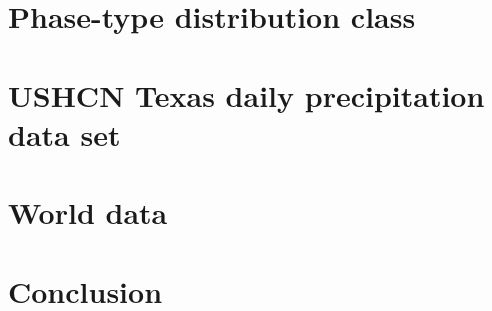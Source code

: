 \documentclass[12pt]{article}\usepackage[]{graphicx}\usepackage[]{color}
\begin{document}
\section{Phase-type distribution class}




\section{USHCN Texas daily precipitation data set}





\section{World data}



\section{Conclusion}




\end{document}
